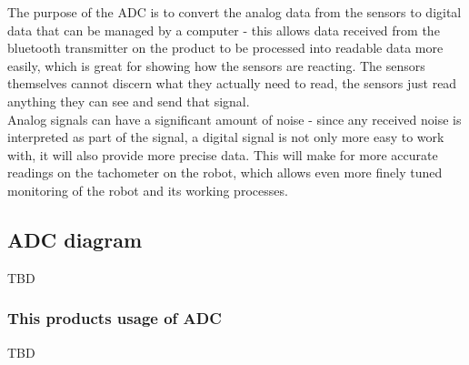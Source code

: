 The purpose of the ADC is to convert the analog data from the sensors to digital data that can be managed by a computer - this allows data received from the bluetooth transmitter on the product to be processed into readable data more easily, which is great for showing how the sensors are reacting. The sensors themselves cannot discern what they actually need to read, the sensors just read anything they can see and send that signal. \\
Analog signals can have a significant amount of noise - since any received noise is interpreted as part of the signal, a digital signal is not only more easy to work with, it will also provide more precise data. This will make for more accurate readings on the tachometer on the robot, which allows even more finely tuned monitoring of the robot and its working processes. \\

\subsection{ADC diagram} 
TBD

\subsubsection{This products usage of ADC}

TBD
